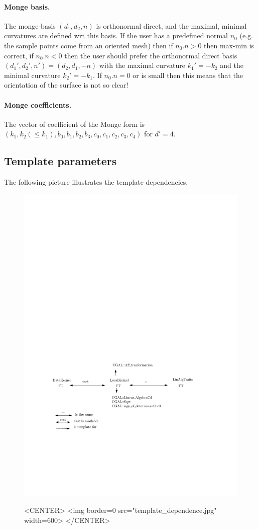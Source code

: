 \paragraph{Monge basis.} The monge-basis $(d_1,d_2,n)$ is orthonormal
direct, and the maximal, minimal curvatures are defined wrt this
basis. If the user has a predefined normal $n_0$ (e.g. the sample
points come from an oriented mesh) then if $n_0 . n >0$ then max-min is
correct, if $n_0 . n <0$ then the user should prefer the orthonormal
direct basis $(d_1',d_2',n')=(d_2,d_1,-n)$ with the maximal curvature
$k_1'=-k_2$ and the minimal curvature $k_2'=-k_1$. If $n_0 . n =0$ or
is small then this means that the orientation of the surface is not so
clear!

\paragraph{Monge coefficients.}
The vector of coefficient of the Monge form is $(k_1, k_2 (\leq k_1),
b_0, b_1, b_2, b_3, c_0, c_1, c_2, c_3, c_4)$ for $d' = 4$.

\subsection{Template parameters}

The following picture illustrates the template dependencies.
\begin{figure}[h!]
\begin{ccTexOnly}
\centerline{
\includegraphics[width=.5\linewidth]{Jet_fitting_3_ref/template_dependence}}
\end{ccTexOnly}


\begin{ccHtmlOnly}
<CENTER>
<img border=0 src="template_dependence.jpg" width=600>
</CENTER>
\end{ccHtmlOnly}
\end{figure}

